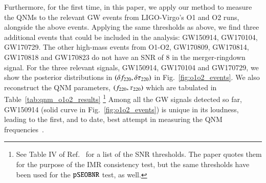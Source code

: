 Furthermore, for the first time, in this paper, we apply our method to
measure the QNMs to the relevant
GW events from LIGO-Virgo's O1 and O2 runs, alongside
the above events. Applying the same thresholds as above, we find three
additional events that could be included in the analysis: GW150914,
GW170104, GW170729. The other high-mass events from O1-O2, GW170809,
GW170814, GW170818 and GW170823 do not have an SNR of $8$ in the
merger-ringdown signal. For the three relevant signals, GW150914,
GW170104 and GW170729, we show the posterior distributions in
$(\delta f_{\text{220}}, \delta \tau_{\text{220}})$ in Fig.~\ref{fig:o1o2_events}. We also reconstruct the QNM parameters, $(f_{\text{220}}, \tau_{\text{220}})$
which are tabulated in Table~\ref{tab:qnm_o1o2_results} \footnote{See
  Table IV of Ref.~\cite{Abbott:2020jks} for a list of the SNR
  thresholds. The paper quotes them for the purpose of the IMR
  consistency test, but the same thresholds have been used for the
  $\texttt{pSEOBNR}$ test, as well.} Among all the GW signals detected so far,
GW150914 (solid curve in Fig.~\ref{fig:o1o2_events}) is unique in its
loudness, leading to the first, and to date, best attempt in measuring the QNM frequencies~\cite{LSC_2016grtests,Brito:2018rfr,Carullo:2019flw,Isi:2019aib}.

